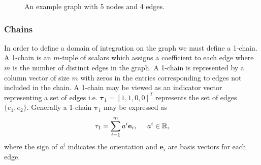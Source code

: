 \documentclass[12pt]{article}
\begin{document}
\begin{figure}
\centering
{} 
\caption{An example graph with 5 nodes and 4 edges.}
\label{fig:example_network}
\end{figure}

\subsubsection{Chains}

In order to define a domain of integration on the graph we must define a 1-chain. A 1-chain is an $m$-tuple of scalars which assigns a coefficient to each edge where $m$ is the number of distinct edges in the graph. A 1-chain is represented by a column vector of size $m$ with zeros in the entries corresponding to edges not included in the chain. A 1-chain may be viewed as an indicator vector representing a set of edges i.e. $\mathbf{\tau}_1 = [1, 1, 0, 0]^T$ represents the set of edges $\{ e_1, e_2 \}$. Generally a 1-chain $\mathbf{\tau}_1$ may be expressed as 
\begin{align}
\mathbf{\tau}_1 =  \sum_{i=1}^m a^i \mathbf{e}_i, \hspace{0.5cm} a^i \in \mathbb{R},
\end{align}
where the sign of $a^i$ indicates the orientation and $\mathbf{e}_i$ are basis vectors for each edge. 
\end{document}
